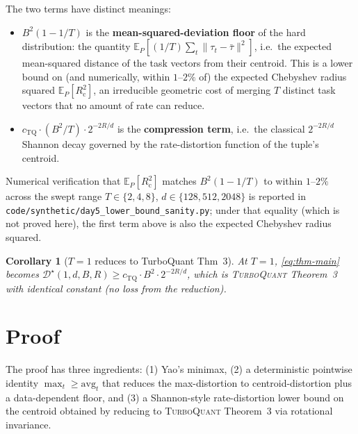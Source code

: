 \documentclass{article}
\newtheorem{corollary}[theorem]{Corollary}
\theoremstyle{remark}
\newcommand{\E}{\mathbb{E}}
\newcommand{\cheb}{R_{\mathrm{c}}}
\begin{document}
The two terms have distinct meanings:
\begin{itemize}
  \item $B^2(1 - 1/T)$ is the \textbf{mean-squared-deviation floor}
  of the hard distribution: the quantity $\E_P[(1/T)\sum_t\|\tau_t -
  \bar\tau\|^2]$, i.e.\ the expected mean-squared distance of the
  task vectors from their centroid. This is a lower bound on (and
  numerically, within $1$--$2\%$ of) the expected Chebyshev radius
  squared $\E_P[\cheb^2]$, an irreducible geometric cost of
  merging $T$ distinct task vectors that no amount of rate can
  reduce.
  \item $c_{\mathrm{TQ}} \cdot (B^2/T) \cdot 2^{-2R/d}$ is the
  \textbf{compression term}, i.e.\ the classical $2^{-2R/d}$ Shannon
  decay governed by the rate-distortion function of the tuple's
  centroid.
\end{itemize}
Numerical verification that $\E_P[\cheb^2]$ matches $B^2(1-1/T)$ to
within $1$--$2\%$ across the swept range $T \in \{2,4,8\}$, $d \in
\{128, 512, 2048\}$ is reported in
\texttt{code/synthetic/day5\_lower\_bound\_sanity.py}; under that
equality (which is not proved here), the first term above is also
the expected Chebyshev radius squared.

\begin{corollary}[$T=1$ reduces to TurboQuant Thm~3]
At $T=1$, \eqref{eq:thm-main} becomes $\mathcal{D}^\star(1,d,B,R)
\geq c_{\mathrm{TQ}} \cdot B^2 \cdot 2^{-2R/d}$, which is
\textsc{TurboQuant} Theorem~3 with identical constant (no loss from
the reduction).
\end{corollary}

\section{Proof}\label{sec:proof}

The proof has three ingredients: (1) Yao's minimax, (2) a
deterministic pointwise identity $\max_t \geq \mathrm{avg}_t$ that
reduces the max-distortion to centroid-distortion plus a
data-dependent floor, and (3) a Shannon-style rate-distortion lower
bound on the centroid obtained by reducing to \textsc{TurboQuant}
Theorem~3 via rotational invariance.
\end{document}
